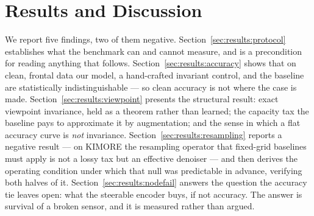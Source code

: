 %
%
%
%

\section{Results and Discussion}
\label{sec:results}

We report five findings, two of them negative. Section~\ref{sec:results:protocol} establishes what
the benchmark can and cannot measure, and is a precondition for reading anything that follows.
Section~\ref{sec:results:accuracy} shows that on clean, frontal data our model, a hand-crafted
invariant control, and the baseline are statistically indistinguishable --- so clean accuracy is
not where the case is made. Section~\ref{sec:results:viewpoint} presents the structural result:
exact viewpoint invariance, held as a theorem rather than learned; the capacity tax the baseline
pays to approximate it by augmentation; and the sense in which a flat accuracy curve is
\emph{not} invariance. Section~\ref{sec:results:resampling} reports a negative result --- on KIMORE
the resampling operator that fixed-grid baselines must apply is not a lossy tax but an effective
denoiser --- and then derives the operating condition under which that null was predictable in
advance, verifying both halves of it. Section~\ref{sec:results:nodefail} answers the question the
accuracy tie leaves open: what the steerable encoder buys, if not accuracy. The answer is survival
of a broken sensor, and it is measured rather than argued.

